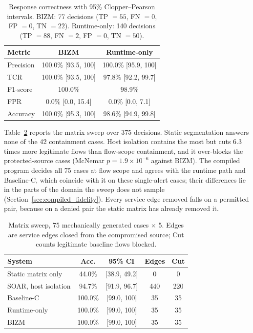 \documentclass[final,5p]{elsarticle}
\begin{document}
\begin{table}[t]
    \centering
    \caption{Response correctness with 95\% Clopper--Pearson intervals. BIZM: 77 decisions (TP $=55$, FN $=0$, FP $=0$, TN $=22$). Runtime-only: 140 decisions (TP $=88$, FN $=2$, FP $=0$, TN $=50$).}
    \label{tab:confusion}
    \small
    \setlength{\tabcolsep}{4pt}
    \begin{tabular}{@{}lcc@{}}
        \toprule
        \textbf{Metric} & \textbf{BIZM} & \textbf{Runtime-only} \\
        \midrule
        Precision & 100.0\% [93.5, 100] & 100.0\% [95.9, 100] \\
        TCR       & 100.0\% [93.5, 100] & 97.8\% [92.2, 99.7] \\
        F1-score  & 100.0\%             & 98.9\% \\
        FPR       & 0.0\% [0.0, 15.4]   & 0.0\% [0.0, 7.1] \\
        Accuracy  & 100.0\% [95.3, 100] & 98.6\% [94.9, 99.8] \\
        \bottomrule
    \end{tabular}
\end{table}

Table~\ref{tab:sweep} reports the matrix sweep over 375 decisions. Static segmentation answers none of the 42 containment cases. Host isolation contains the most but cuts 6.3 times more legitimate flows than flow-scope containment, and it over-blocks the protected-source cases (McNemar $p=1.9\times10^{-6}$ against BIZM). The compiled program decides all 75 cases at flow scope and agrees with the runtime path and Baseline-C, which coincide with it on these single-alert cases; their differences lie in the parts of the domain the sweep does not sample (Section~\ref{sec:compiled_fidelity}). Every service edge removed falls on a permitted pair, because on a denied pair the static matrix has already removed it.

\begin{table}[t]
    \centering
    \caption{Matrix sweep, 75 mechanically generated cases $\times$ 5. Edges are service edges closed from the compromised source; Cut counts legitimate baseline flows blocked.}
    \label{tab:sweep}
    \small
    \setlength{\tabcolsep}{4pt}
    \begin{tabular}{@{}lcccc@{}}
        \toprule
        \textbf{System} & \textbf{Acc.} & \textbf{95\% CI} & \textbf{Edges} & \textbf{Cut} \\
        \midrule
        Static matrix only   & 44.0\%  & [38.9, 49.2] & 0   & 0   \\
        SOAR, host isolation & 94.7\%  & [91.9, 96.7] & 440 & 220 \\
        Baseline-C           & 100.0\% & [99.0, 100]  & 35  & 35  \\
        Runtime-only         & 100.0\% & [99.0, 100]  & 35  & 35  \\
        BIZM                 & 100.0\% & [99.0, 100]  & 35  & 35  \\
        \bottomrule
    \end{tabular}
\end{table}
\end{document}
